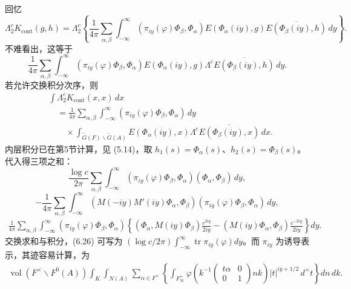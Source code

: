 回忆
\[
 \Lambda_2^cK_{\mathrm{cont}}(g,h)=\Lambda_2^c\left\{
 \frac1{4\pi}\sum_{\alpha,\beta}\int_{-\infty}^{\infty}
 (\pi_{iy}(\varphi)\Phi_\beta,\Phi_\alpha)
 E(\Phi_\alpha(iy),g)\overline{E(\Phi_\beta(iy),h)}\,dy\right\}.
\]
不难看出，这等于
\[
 \frac1{4\pi}\sum_{\alpha,\beta}\int_{-\infty}^{\infty}
 (\pi_{iy}(\varphi)\Phi_\beta,\Phi_\alpha)
 E(\Phi_\alpha(iy),g)\Lambda^c\overline{E(\Phi_\beta(iy),h)}\,dy.
\]
若允许交换积分次序，则
\[
\begin{split}
 &\int\Lambda_2^cK_{\mathrm{cont}}(x,x)\,dx\\
 &\quad=\frac1{4\pi}\sum_{\alpha,\beta}\int_{-\infty}^{\infty}
 (\pi_{iy}(\varphi)\Phi_\beta,\Phi_\alpha)\,dy\\
 &\qquad\times\int_{\widetilde G(F)\backslash\widetilde G(A)}
 E(\Phi_\alpha(iy),x)\Lambda^c\overline{E(\Phi_\beta(iy),x)}\,dx.
\end{split}
\]
内层积分已在第5节计算，见 (5.14)，取 $h_1(s)=\Phi_\alpha(s)$、$h_2(s)=\Phi_\beta(s)$。
代入得三项之和：
\begin{equation}
 \frac{\log c}{2\pi}\sum_{\alpha,\beta}\int_{-\infty}^{\infty}
 (\pi_{iy}(\varphi)\Phi_\beta,\Phi_\alpha)(\Phi_\alpha,\Phi_\beta)\,dy,\tag{6.26}
\end{equation}
\begin{equation}
 -\frac1{4\pi}\sum_{\alpha,\beta}\int_{-\infty}^{\infty}
 (M(-iy)M'(iy)\Phi_\alpha,\Phi_\beta)
 (\pi_{iy}(\varphi)\Phi_\beta,\Phi_\alpha)\,dy,\tag{6.27}
\end{equation}
\begin{equation}
\begin{split}
 \frac1{4\pi}\sum_{\alpha,\beta}\int_{-\infty}^{\infty}
 (\pi_{iy}(\varphi)\Phi_\beta,\Phi_\alpha)
 \left\{(\Phi_\alpha,M(iy)\Phi_\beta)\frac{c^{2iy}}{2iy}
 -(M(iy)\Phi_\alpha,\Phi_\beta)\frac{c^{-2iy}}{2iy}\right\}dy.
\end{split}\tag{6.28}
\end{equation}
交换求和与积分，(6.26) 可写为
$(\log c/2\pi)\int_{-\infty}^{\infty}\operatorname{tr}\pi_{iy}(\varphi)dy$。而 $\pi_{iy}$ 为诱导表示，其迹容易计算，为
\[
\begin{split}
 \operatorname{vol}(F^\times\backslash F^0(A))\int_K\int_{N(A)}\sum_{\alpha\in F^\times}
 \left\{\int_{F_\infty^+}
 \varphi\!\left(k^{-1}\begin{pmatrix}t\alpha&0\\0&1\end{pmatrix}nk\right)
 |t|^{iy+1/2}\,d^\times t\right\}dn\,dk.
\end{split}
\]
